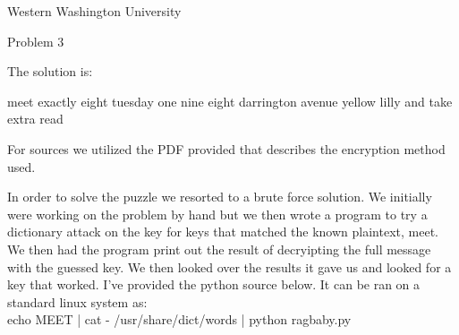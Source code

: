 \documentclass{article}%
\begin{document}
\begin{flushright}
Western Washington University \\
\end{flushright}

\begin{center}
Problem 3
\end{center}

The solution is: \\
\begin{center}
meet exactly eight tuesday one nine eight darrington avenue yellow lilly and take extra read
\end{center}

For sources we utilized the PDF provided that describes the encryption method used.

In order to solve the puzzle we resorted to a brute force solution. We initially were working on the problem by hand but we then wrote a program to try a dictionary attack on the key for keys that matched the known plaintext, meet. We then had the program print out the result of decryipting the full message with the guessed key. We then looked over the results it gave us and looked for a key that worked. I've provided the python source below. It can be ran on a standard linux system as: \\

echo MEET | cat - /usr/share/dict/words | python ragbaby.py




\end{document}
